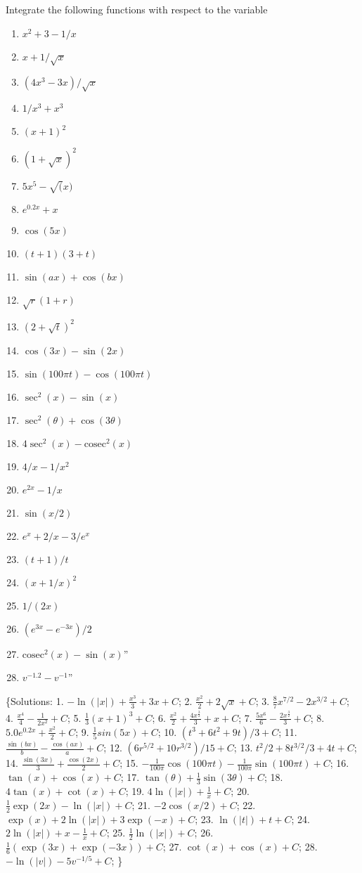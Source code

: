 \documentclass[
  11pt,
  oneside]{book}
\providecommand{\tightlist}{%
  \setlength{\itemsep}{0pt}\setlength{\parskip}{0pt}}
\theoremstyle{definition}
\theoremstyle{definition}
\theoremstyle{definition}
\theoremstyle{definition}
\theoremstyle{remark}
\begin{document}
Integrate the following functions with respect to the variable

\begin{enumerate}
\def\labelenumi{\arabic{enumi}.}
\tightlist
\item
  \(x^2+3-1/x\)
\item
  \(x+1/\sqrt{x}\)
\item
  \((4x^3-3x)/\sqrt{x}\)
\item
  \(1/x^3+x^3\)
\item
  \((x+1)^2\)
\item
  \((1+\sqrt{x})^2\)
\item
  \(5x^5-\sqrt(x)\)
\item
  \(e^{0.2x}+x\)
\item
  \(\cos(5x)\)
\item
  \((t+1)(3+t)\)
\item
  \(\sin(ax)+\cos(bx)\)
\item
  \(\sqrt{r}(1+r)\)
\item
  \((2+\sqrt{t})^2\)
\item
  \(\cos(3x)-\sin(2x)\)
\item
  \(\sin(100\pi t)-\cos(100\pi t)\)
\item
  \(\sec^2(x)-\sin(x)\)
\item
  \(\sec^2(\theta)+\cos(3\theta)\)
\item
  \(4\sec^2(x)-\text{cosec}^2(x)\)
\item
  \(4/x-1/x^2\)
\item
  \(e^{2x}-1/x\)
\item
  \(\sin(x/2)\)
\item
  \(e^x+2/x-3/e^x\)
\item
  \((t+1)/t\)
\item
  \((x+1/x)^2\)
\item
  \(1/(2x)\)
\item
  \((e^{3x}-e^{-3x})/2\)
\item
  \(\text{cosec}^2(x)-\sin(x)\)''
\item
  \(v^{-1.2}-v^{-1}\)''
\end{enumerate}

\{Solutions:
1. \(-\ln(|x|)+{\frac{x^3}{3}}+3x+C\);
2. \({\frac{x^2}{2}}+2\sqrt{x}+C\);
3. \(\frac{8}{7}x^{7/2} - 2x^{3/2}+C\);
4. \({\frac{x^4}{4}}-{\frac{1}{2x^2}}+C\);
5. \(\frac{1}{3}(x+1)^3+C\);
6. \({\frac{x^2}{2}}+\frac{4x^{\frac{3}{2}}}{3}+x+C\);
7. \({\frac{5x^6}{6}}-\frac{2x^{\frac{3}{2}}}{3}+C\);
8. \(5.0e^{0.2x}+\frac{x^2}{2}+C\);
9. \(\frac{1}{5}sin(5x)+C\);
10. \((t^3+6t^2+9t)/3+C\);
11. \(\frac{\sin(bx)}{b}-\frac{\cos(ax)}{a}+C\);
12. \((6r^{5/2}+10r^{3/2})/15+C\);
13. \(t^2/2 + 8t^{3/2}/3+4t+C\);
14. \(\frac{\sin(3x)}{3}+\frac{\cos(2x)}{2}+C\);
15. \(-\frac{1}{100\pi}\cos(100\pi t) - \frac{1}{100\pi}\sin(100\pi t) + C\);
16. \(\tan(x)+\cos(x)+C\);
17. \(\tan(\theta) + \frac{1}{3}\sin(3\theta)+C\);
18. \(4\tan(x) + \cot(x) +C\);
19. \(4\ln(|x|) + \frac{1}{x} +C\);
20. \(\frac{1}{2}\exp(2x)-\ln(|x|) + C\);
21. \(-2\cos(x/2)+C\);
22. \(\exp(x) + 2\ln(|x|) +3\exp(-x)+C\);
23. \(\ln(|t|) + t + C\);
24. \(2\ln(|x|) + x - \frac{1}{x} + C\);
25. \(\frac{1}{2}\ln(|x|)+C\);
26. \(\frac{1}{6}(\exp(3x)+\exp(-3x)) + C\);
27. \(\cot(x)+\cos(x)+C\);
28. \(-\ln(|v|)-5 v^{-1/5}+C\);
\}
\end{document}
